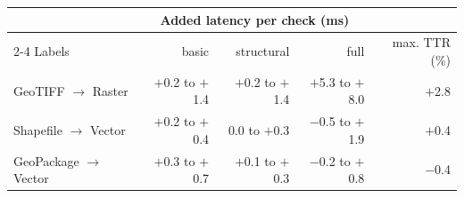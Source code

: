 \begin{tabular}{lrrrr}
\toprule
 & \multicolumn{3}{c}{Added latency per check (ms)} & \\
\cmidrule(lr){2-4}
Labels & basic & structural & full & max. TTR (\%) \\
\midrule
GeoTIFF $\rightarrow$ Raster & $+$0.2 to $+$1.4 & $+$0.2 to $+$1.4 & $+$5.3 to $+$8.0 & $+$2.8 \\
Shapefile $\rightarrow$ Vector & $+$0.2 to $+$0.4 & 0.0 to $+$0.3 & $-$0.5 to $+$1.9 & $+$0.4 \\
GeoPackage $\rightarrow$ Vector & $+$0.3 to $+$0.7 & $+$0.1 to $+$0.3 & $-$0.2 to $+$0.8 & $-$0.4 \\
\bottomrule
\end{tabular}
